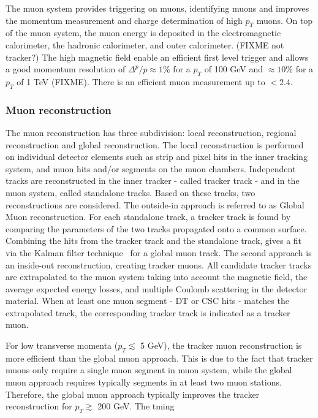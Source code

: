 The muon system provides triggering on muons, identifying muons and improves the momentum measurement and charge determination of high $p_T$ muons. On top of the muon system, the muon energy is deposited in the electromagnetic calorimeter, the hadronic calorimeter, and outer calorimeter. (FIXME not tracker?) The high magnetic field enable an efficient first level trigger and allows a good momentum resolution of $\Delta ^p / p \approx 1\%$ for a $p_T$ of 100 \si{ \GeV} and $\approx 10\%$ for a $p_T$ of 1 \si{ \TeV} (FIXME). There is an efficient muon measurement up to \abspsrap $<2.4$.
\subsubsection*{Muon reconstruction}
 The muon reconstruction\cite{Chatrchyan:2012xi} has three subdivision: local reconstruction, regional reconstruction and global reconstruction. 
The local reconstruction is performed on individual detector elements such as strip and pixel hits in the inner tracking system, and muon hits and/or segments on the muon chambers. Independent tracks are reconstructed in the inner tracker - called tracker track -  and in the muon system, called standalone tracks.
Based on these tracks, two reconstructions are considered.
The outside-in approach is referred to as Global Muon reconstruction. 
 For each standalone track, a tracker track is found by comparing the parameters of the two tracks propagated onto a common surface. Combining the hits from the tracker track and the standalone track, gives a fit via the Kalman filter technique~\cite{FRUHWIRTH1987444,Billoir:1989mh} for a global muon track. 
 The second approach is an inside-out reconstruction, creating tracker muons. 
 All candidate tracker tracks are extrapolated to the muon system taking into account the magnetic field, the average expected energy losses, and multiple Coulomb scattering in the detector material. When at least one muon segment - DT or CSC hits -  matches the extrapolated track, the corresponding tracker track is indicated as a tracker muon. 
 
 For low transverse momenta ($p_T \lesssim$ 5 \si{ \GeV}), the tracker muon reconstruction is  more efficient than the global muon approach. This is due to the fact that tracker muons only require a single muon  segment in muon system, while the global muon approach requires typically segments in at least two muon stations. Therefore, the global muon approach typically improves the tracker reconstruction for $p_T\gtrsim$ 200 \si{ \GeV}.
 The tming 


